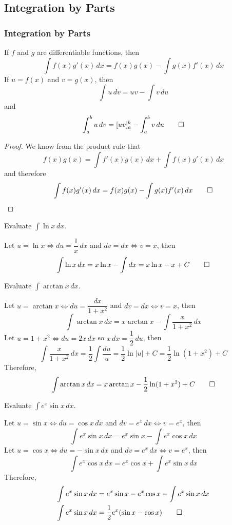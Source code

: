 \subsection{Integration by Parts}
\subsubsection{Integration by Parts}
\begin{theorem}
    If \(f\) and \(g\) are differentiable functions, then
    \[\int f(x)g'(x)\,dx=f(x)g(x)-\int g(x)f'(x)\,dx\]
    If \(u=f(x)\) and \(v=g(x)\), then
    \[\int u\,dv=uv-\int v\,du\]
    and
    \[\int_a^b u\,dv=[uv]_a^b-\int_a^b v\,du\qedhere\]
\end{theorem}
\begin{proof}
    We know from the product rule that
    \[f(x)g(x)=\int f'(x)g(x)\,dx+\int f(x)g'(x)\,dx\]
    and therefore
    \[\int f(x)g'(x)\,dx=f(x)g(x)-\int g(x)f'(x)\,dx\qedhere\]
\end{proof}
\begin{problem}
    Evaluate \(\displaystyle{\int\ln x\,dx}\).
\end{problem}
\begin{solution}
    Let \(u=\ln x\iff du=\dfrac{1}{x}\,dx\) and \(dv=dx\iff v=x\),
    then
    \[\int\ln x\,dx=x\ln x-\int dx=x\ln x-x+C\qedhere\]
\end{solution}
\begin{problem}
    Evaluate \(\displaystyle{\int\arctan x\,dx}\).
\end{problem}
\begin{solution}
    Let \(u=\arctan x\iff du=\dfrac{dx}{1+x^2}\) and \(dv=dx\iff v=x\), then
    \[\int\arctan x\,dx=x\arctan x-\int\frac{x}{1+x^2}\,dx\]
    Let \(u=1+x^2\iff du=2x\,dx\) so \(x\,dx=\dfrac{1}{2}\,du\), then
    \[\int\frac{x}{1+x^2}\,dx=\frac{1}{2}\int\frac{du}{u}=\frac{1}{2}\ln|u|+C
    =\frac{1}{2}\ln(1+x^2)+C\]
    Therefore,
    \[\int\arctan x\,dx=x\arctan x-\frac{1}{2}\ln(1+x^2)+C\qedhere\]
\end{solution}
\begin{problem}
    Evaluate \(\displaystyle{\int e^x\sin x\,dx}\).
\end{problem}
\begin{solution}
    Let \(u=\sin x\iff du=\cos x\,dx\) and \(dv=e^x\,dx\iff v=e^x\),
    then
    \[\int e^x\sin x\,dx=e^x\sin x-\int e^x\cos x\,dx\]
    Let \(u=\cos x\iff du=-\sin x\,dx\) and \(dv=e^x\,dx\iff v=e^x\),
    then
    \[\int e^x\cos x\,dx=e^x\cos x+\int e^x\sin x\,dx\]
    Therefore,
    \begin{align*}
        \int e^x\sin x\,dx &= e^x\sin x-e^x\cos x-\int e^x\sin x\,dx \\
        \int e^x\sin x\,dx &= \frac{1}{2}e^x(\sin x-\cos x) \qedhere
    \end{align*}
\end{solution}
